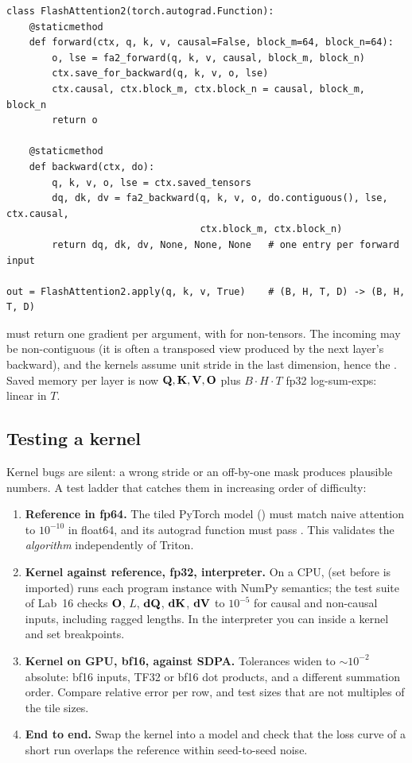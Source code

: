 \begin{lstlisting}[caption={The autograd function: save $(\mat{Q},\mat{K},\mat{V},\mat{O},L)$, never $\mat{P}$.},label={lst:perf:fa2fn}]
class FlashAttention2(torch.autograd.Function):
    @staticmethod
    def forward(ctx, q, k, v, causal=False, block_m=64, block_n=64):
        o, lse = fa2_forward(q, k, v, causal, block_m, block_n)
        ctx.save_for_backward(q, k, v, o, lse)
        ctx.causal, ctx.block_m, ctx.block_n = causal, block_m, block_n
        return o

    @staticmethod
    def backward(ctx, do):
        q, k, v, o, lse = ctx.saved_tensors
        dq, dk, dv = fa2_backward(q, k, v, o, do.contiguous(), lse, ctx.causal,
                                  ctx.block_m, ctx.block_n)
        return dq, dk, dv, None, None, None   # one entry per forward input

out = FlashAttention2.apply(q, k, v, True)    # (B, H, T, D) -> (B, H, T, D)
\end{lstlisting}

 must return one gradient per  argument, with  for
non-tensors. The incoming  may be non-contiguous (it is often a transposed view produced by
the next layer's backward), and the kernels assume unit stride in the last dimension, hence the
. Saved memory per layer is now $\mathbf{Q},\mathbf{K},\mathbf{V},\mathbf{O}$ plus $B\cdot H\cdot T$
fp32 log-sum-exps: linear in $T$.

\subsection{Testing a kernel}

Kernel bugs are silent: a wrong stride or an off-by-one mask produces plausible numbers. A test
ladder that catches them in increasing order of difficulty:
\begin{enumerate}
\item \textbf{Reference in fp64.} The tiled PyTorch model () must match naive
  attention to $10^{-10}$ in float64, and its autograd function must pass
  . This validates the \emph{algorithm} independently of Triton.
\item \textbf{Kernel against reference, fp32, interpreter.} On a CPU, 
  (set before  is imported) runs each program instance with NumPy semantics; the test
  suite of Lab~16 checks $\mathbf{O}$, $L$, $\mathbf{dQ}$, $\mathbf{dK}$, $\mathbf{dV}$ to $10^{-5}$ for causal and
  non-causal inputs, including ragged lengths. In the interpreter you can  inside a
  kernel and set breakpoints.
\item \textbf{Kernel on GPU, bf16, against SDPA.} Tolerances widen to $\sim10^{-2}$ absolute: bf16
  inputs, TF32 or bf16 dot products, and a different summation order. Compare relative error per
  row, and test sizes that are not multiples of the tile sizes.
\item \textbf{End to end.} Swap the kernel into a model and check that the loss curve of a short
  run overlaps the reference within seed-to-seed noise.
\end{enumerate}

